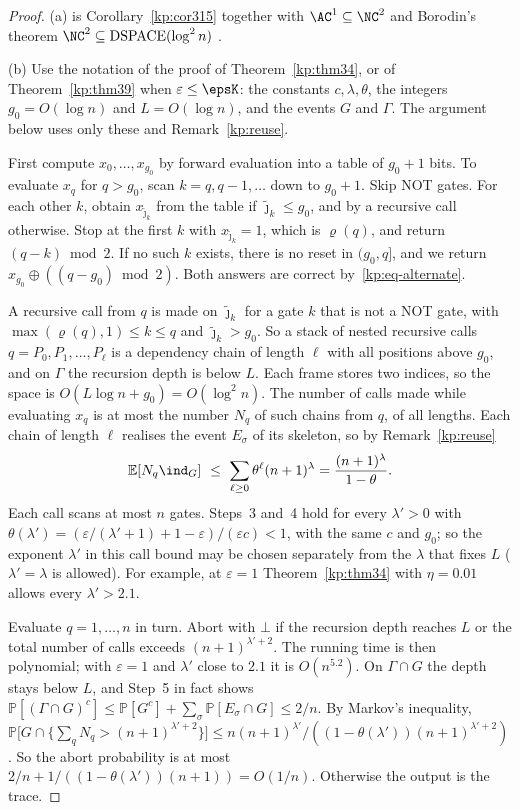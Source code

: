 \documentclass[11pt]{amsart}
\theoremstyle{definition}
\theoremstyle{remark}
\newcommand{\eps}{\varepsilon}
\newcommand{\jt}{\tilde{\jmath}}
\newcommand{\PP}{\mathbb{P}}
\newcommand{\EE}{\mathbb{E}}
\begin{document}
\begin{proof}
(a) is Corollary~\ref{kp:cor315} together with $\AC^1\subseteq\NC^2$ and
Borodin's theorem $\NC^2\subseteq\mathrm{DSPACE}(\log^2 n)$
\cite{kp-borodin}.

(b) Use the notation of the proof of Theorem~\ref{kp:thm34}, or of
Theorem~\ref{kp:thm39} when $\eps\le\epsK$: the constants $c,\lambda,\theta$,
the integers $g_0=O(\log n)$ and $L=O(\log n)$, and the events $G$ and
$\Gamma$. The argument below uses only these and Remark~\ref{kp:reuse}.

First compute $x_0,\dots,x_{g_0}$ by forward evaluation into a table of
$g_0+1$ bits. To evaluate $x_q$ for $q>g_0$, scan $k=q,q-1,\dots$ down to
$g_0+1$. Skip NOT gates. For each other $k$, obtain $x_{\jt_k}$ from the table if
$\jt_k\le g_0$, and by a recursive call otherwise. Stop at the first $k$ with
$x_{\jt_k}=1$, which is $\varrho(q)$, and return $(q-k)\bmod 2$. If no such $k$
exists, there is no reset in $(g_0,q]$, and we return
$x_{g_0}\oplus((q-g_0)\bmod 2)$. Both answers are correct
by~\eqref{kp:eq-alternate}.

A recursive call from $q$ is made on $\jt_k$ for a gate $k$ that is not a NOT
gate, with $\max(\varrho(q),1)\le k\le q$ and $\jt_k>g_0$. So a stack of nested
recursive calls $q=P_0,P_1,\dots,P_\ell$ is a dependency chain of length $\ell$
with all positions above $g_0$, and on $\Gamma$ the recursion depth is below
$L$. Each frame stores two indices, so the space is
$O(L\log n+g_0)=O(\log^2 n)$. The number of calls made while evaluating $x_q$
is at most the number $N_q$ of such chains from $q$, of all lengths. Each chain
of length $\ell$ realises the event $E_\sigma$ of its skeleton, so by
Remark~\ref{kp:reuse}
\[
  \EE[N_q\ind_G]\ \le\ \sum_{\ell\ge0}\theta^\ell(n+1)^\lambda
  =\frac{(n+1)^\lambda}{1-\theta}.
\]
Each call scans at most $n$ gates. Steps~3 and~4 hold for every $\lambda'>0$ with
$\theta(\lambda')=(\eps/(\lambda'+1)+1-\eps)/(\eps c)<1$, with the same $c$ and
$g_0$; so the exponent $\lambda'$ in this call bound may be chosen separately
from the $\lambda$ that fixes $L$ ($\lambda'=\lambda$ is allowed). For example,
at $\eps=1$ Theorem~\ref{kp:thm34} with $\eta=0.01$ allows every
$\lambda'>2.1$.

Evaluate $q=1,\dots,n$ in turn. Abort with $\bot$ if the recursion depth
reaches $L$ or the total number of calls exceeds $(n+1)^{\lambda'+2}$. The
running time is then polynomial; with $\eps=1$ and $\lambda'$ close to $2.1$ it
is $O(n^{5.2})$. On $\Gamma\cap G$ the depth stays below $L$, and Step~5 in
fact shows $\PP[(\Gamma\cap G)^c]\le\PP[G^c]+\sum_\sigma\PP[E_\sigma\cap G]\le
2/n$. By Markov's inequality,
$\PP\bigl[G\cap\{\sum_qN_q>(n+1)^{\lambda'+2}\}\bigr]\le
n(n+1)^{\lambda'}/((1-\theta(\lambda'))(n+1)^{\lambda'+2})$. So the abort
probability is at most $2/n+1/((1-\theta(\lambda'))(n+1))=O(1/n)$. Otherwise
the output is the trace.
\end{proof}
\end{document}
